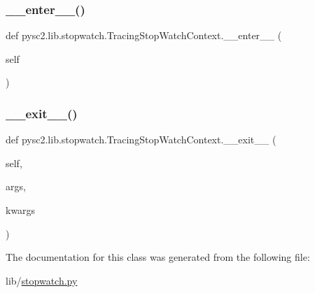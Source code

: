 \subsubsection{\texorpdfstring{\+\_\+\+\_\+enter\+\_\+\+\_\+()}{\_\_enter\_\_()}}
{\footnotesize\ttfamily def pysc2.\+lib.\+stopwatch.\+Tracing\+Stop\+Watch\+Context.\+\_\+\+\_\+enter\+\_\+\+\_\+ (\begin{DoxyParamCaption}\item[{}]{self }\end{DoxyParamCaption})}

\mbox{\label{classpysc2_1_1lib_1_1stopwatch_1_1_tracing_stop_watch_context_a41722e8b20fbdde29145c764e8bee690}} 
\subsubsection{\texorpdfstring{\+\_\+\+\_\+exit\+\_\+\+\_\+()}{\_\_exit\_\_()}}
{\footnotesize\ttfamily def pysc2.\+lib.\+stopwatch.\+Tracing\+Stop\+Watch\+Context.\+\_\+\+\_\+exit\+\_\+\+\_\+ (\begin{DoxyParamCaption}\item[{}]{self,  }\item[{}]{args,  }\item[{}]{kwargs }\end{DoxyParamCaption})}



The documentation for this class was generated from the following file\+:\begin{DoxyCompactItemize}
\item 
lib/\mbox{\hyperlink{stopwatch_8py}{stopwatch.\+py}}\end{DoxyCompactItemize}

